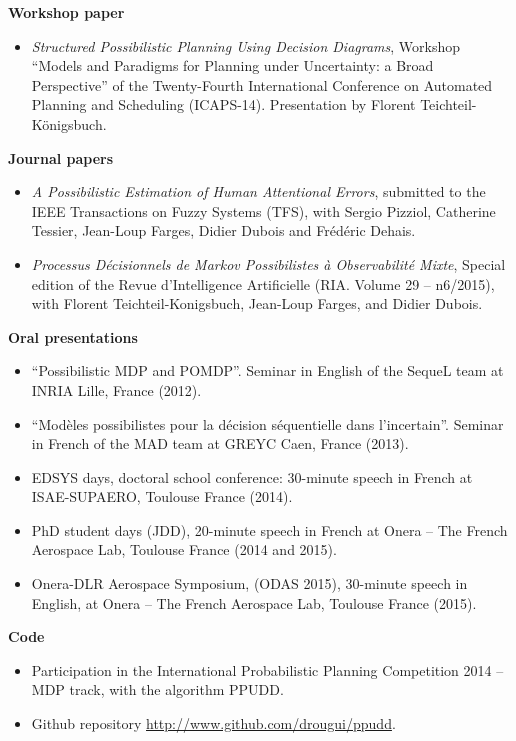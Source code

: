 \textbf{Workshop paper}
\begin{itemize}
\item \textit{Structured Possibilistic Planning Using Decision Diagrams}, 
Workshop ``Models and Paradigms for Planning under Uncertainty: a Broad Perspective'' 
of the Twenty-Fourth International Conference on Automated Planning and Scheduling (ICAPS-14).
Presentation by Florent Teichteil-K\"onigsbuch.
\end{itemize}

\textbf{Journal papers}
\begin{itemize}
\item \textit{A Possibilistic Estimation of Human Attentional Errors},
submitted to the IEEE Transactions on Fuzzy Systems (TFS),
with Sergio Pizziol, Catherine Tessier, Jean-Loup Farges, Didier Dubois and Fr\'ed\'eric Dehais.
\item \textit{Processus D\'ecisionnels de Markov Possibilistes \`a Observabilit\'e Mixte},
Special edition of the Revue d'Intelligence Artificielle (RIA. Volume 29 -- n6/2015),
with Florent Teichteil-Konigsbuch, Jean-Loup Farges, and Didier Dubois.
\end{itemize}

\textbf{Oral presentations}
\begin{itemize}
\item ``Possibilistic MDP and POMDP''. Seminar in English of the SequeL team at INRIA Lille, France (2012). 
\item ``Mod\`eles possibilistes pour la d\'ecision s\'equentielle dans l'incertain''. Seminar in French of the MAD team at GREYC Caen, France (2013).
\item EDSYS days, doctoral school conference: 30-minute speech in French at ISAE-SUPAERO, Toulouse France (2014). 
\item PhD student days (JDD), 20-minute speech in French at Onera -- The French Aerospace Lab, Toulouse France (2014 and 2015).
\item Onera-DLR Aerospace Symposium, (ODAS 2015), 30-minute speech in English, at Onera -- The French Aerospace Lab, Toulouse France (2015).
\end{itemize}

\textbf{Code}
\begin{itemize}
\item Participation in the International Probabilistic Planning Competition 2014 -- MDP track, with the algorithm PPUDD.
\item Github repository \url{http://www.github.com/drougui/ppudd}.
\end{itemize}
